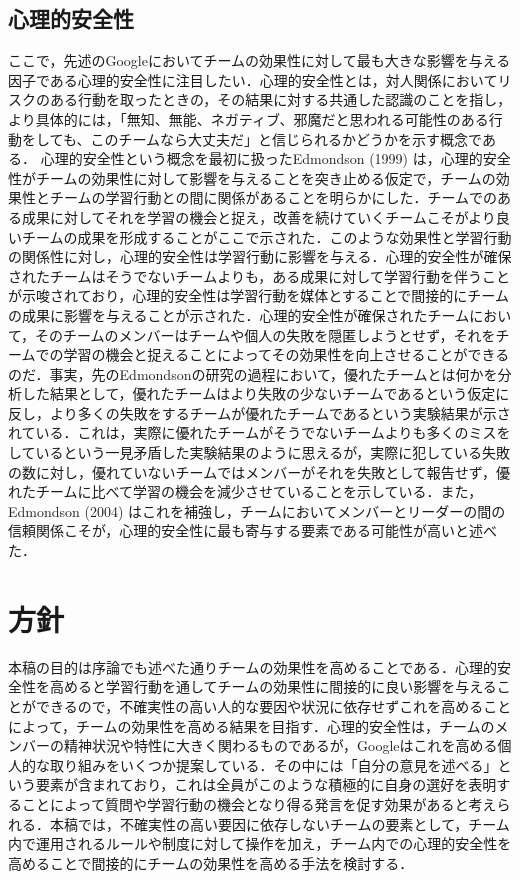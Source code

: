 \documentclass[a4paper, 11pt]{jsarticle}
\begin{document}
\subsection{心理的安全性}
ここで，先述のGoogle\cite{Google}においてチームの効果性に対して最も大きな影響を与える因子である心理的安全性に注目したい．心理的安全性とは，対人関係においてリスクのある行動を取ったときの，その結果に対する共通した認識のことを指し，より具体的には，「無知、無能、ネガティブ、邪魔だと思われる可能性のある行動をしても、このチームなら大丈夫だ」と信じられるかどうかを示す概念である．
心理的安全性という概念を最初に扱ったEdmondson (1999) \cite{Edmondson}は，心理的安全性がチームの効果性に対して影響を与えることを突き止める仮定で，チームの効果性とチームの学習行動との間に関係があることを明らかにした．チームでのある成果に対してそれを学習の機会と捉え，改善を続けていくチームこそがより良いチームの成果を形成することがここで示された．このような効果性と学習行動の関係性に対し，心理的安全性は学習行動に影響を与える．心理的安全性が確保されたチームはそうでないチームよりも，ある成果に対して学習行動を伴うことが示唆されており，心理的安全性は学習行動を媒体とすることで間接的にチームの成果に影響を与えることが示された．心理的安全性が確保されたチームにおいて，そのチームのメンバーはチームや個人の失敗を隠匿しようとせず，それをチームでの学習の機会と捉えることによってその効果性を向上させることができるのだ．事実，先のEdmondsonの研究\cite{Edmondson}の過程において，優れたチームとは何かを分析した結果として，優れたチームはより失敗の少ないチームであるという仮定に反し，より多くの失敗をするチームが優れたチームであるという実験結果が示されている．これは，実際に優れたチームがそうでないチームよりも多くのミスをしているという一見矛盾した実験結果のように思えるが，実際に犯している失敗の数に対し，優れていないチームではメンバーがそれを失敗として報告せず，優れたチームに比べて学習の機会を減少させていることを示している．また，Edmondson (2004) \cite{Russell}はこれを補強し，チームにおいてメンバーとリーダーの間の信頼関係こそが，心理的安全性に最も寄与する要素である可能性が高いと述べた．

\section{方針}
本稿の目的は序論でも述べた通りチームの効果性を高めることである．心理的安全性を高めると学習行動を通してチームの効果性に間接的に良い影響を与えることができるので，不確実性の高い人的な要因や状況に依存せずこれを高めることによって，チームの効果性を高める結果を目指す．心理的安全性は，チームのメンバーの精神状況や特性に大きく関わるものであるが，Google\cite{GoogleDoc}はこれを高める個人的な取り組みをいくつか提案している．その中には「自分の意見を述べる」という要素が含まれており，これは全員がこのような積極的に自身の選好を表明することによって質問や学習行動の機会となり得る発言を促す効果があると考えられる．本稿では，不確実性の高い要因に依存しないチームの要素として，チーム内で運用されるルールや制度に対して操作を加え，チーム内での心理的安全性を高めることで間接的にチームの効果性を高める手法を検討する．
\end{document}
